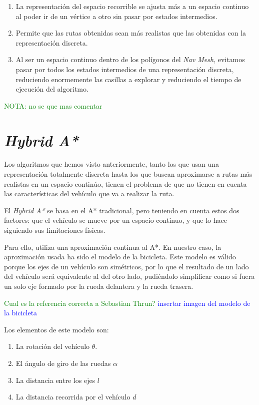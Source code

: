 \begin{enumerate}
\item La representación del espacio recorrible se ajusta más a un espacio continuo al poder ir de un vértice a otro sin pasar por estados intermedios.
\item Permite que las rutas obtenidas sean más realistas que las obtenidas con la representación discreta.
\item Al ser un espacio continuo dentro de los polígonos del \textit{Nav Mesh}, evitamos pasar por todos los estados intermedios de una representación discreta, reduciendo enormemente las casillas a explorar y reduciendo el tiempo de ejecución del algoritmo.
\end{enumerate}

\textcolor{green}{NOTA: no se que mas comentar}

\section{\textit{Hybrid A*}}
Los algoritmos que hemos visto anteriormente, tanto los que usan una representación totalmente discreta hasta los que buscan aproximarse a rutas más realistas en un espacio continúo, tienen el problema de que no tienen en cuenta las características del vehículo que va a realizar la ruta.

El \textit{Hybrid A*} se basa en el A* tradicional, pero teniendo en cuenta estos dos factores: que el vehículo se mueve por un espacio continuo, y que lo hace siguiendo sus limitaciones físicas.

Para ello, utiliza una aproximación continua al A*. En nuestro caso, la aproximación usada ha sido el modelo de la bicicleta. Este modelo es válido porque los ejes de un vehículo son simétricos, por lo que el resultado de un lado del vehículo será equivalente al del otro lado, pudiéndolo simplificar como si fuera un solo eje formado por la rueda delantera y la rueda trasera.

\textcolor{green}{Cual es la referencia correcta a Sebastian Thrun?}
\textcolor{blue}{insertar imagen del modelo de la bicicleta}

Los elementos de este modelo son:
\begin{enumerate}
\item La rotación del vehículo $\theta$.
\item El ángulo de giro de las ruedas $\alpha$
\item La distancia entre los ejes $l$
\item La distancia recorrida por el vehículo $d$
\end{enumerate}

